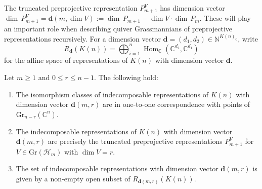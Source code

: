 \documentclass[smallextended,envcountsect,envcountsame]{svjour3}
\numberwithin{equation}{section}
\newcommand{\CC}{\mathbb{C}}
\newcommand{\NN}{\mathbb{N}}
\newcommand{\bfd}{\mathbf{d}}
\newcommand{\cH}{\mathcal{H}}
\newcommand\udim{{\underline{\dim}\, }}
\newcommand{\Gr}{\mathrm{Gr}}
\newcommand{\Hom}{\operatorname{Hom}}
\begin{document}
The truncated preprojective representation $P_{m+1}^V$ has dimension vector  $\udim P_{m+1}^V=\bfd(m,\dim V):=\udim P_{m+1}-\dim V\cdot\udim P_m$.
These will play an important role when describing quiver Grassmannians of preprojective representations recursively.
For a dimension vector $\bfd=(d_1,d_2)\in\NN^{K(n)_0}$, write 
\[R_\bfd(K(n))=\bigoplus_{i=1}^n\Hom_{\CC}(\CC^{d_2},\CC^{d_1})\]
for the affine space of representations of $K(n)$ with dimension vector $\bfd$. 
\begin{proposition}
  \label{pro:indecomposables}
  Let $m\geq 1$ and $0\le r\le n-1$.
  The following hold:
  \begin{enumerate}
    \item The isomorphism classes of indecomposable representations of $K(n)$ with dimension vector $\bfd(m,r)$ are in one-to-one correspondence with points of $\Gr_{n-r}(\CC^n)$.
    \item The indecomposable representations of $K(n)$ with dimension vector $\bfd(m,r)$ are precisely the truncated preprojective representations $P_{m+1}^V$ for $V\in \Gr(\cH_m)$ with $\dim V=r$. 
    \item The set of indecomposable representations with dimension vector $\bfd(m,r)$ is given by a non-empty open subset of $R_{\bfd(m,r)}(K(n))$. 
  \end{enumerate}
\end{proposition}
\end{document}
